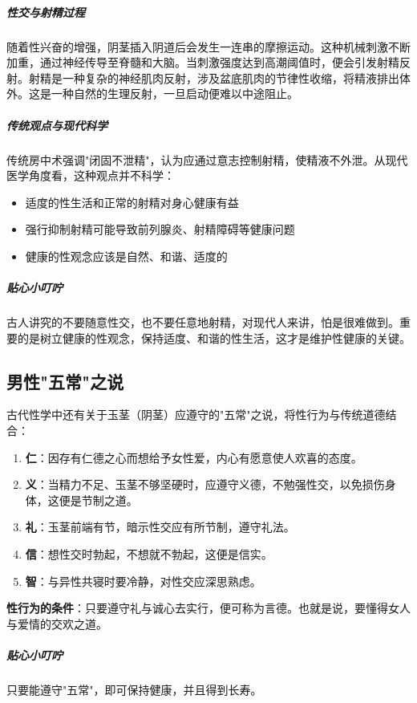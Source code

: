 \begin{enumerate}
\subparagraph{性交与射精过程}

随着性兴奋的增强，阴茎插入阴道后会发生一连串的摩擦运动。这种机械刺激不断加重，通过神经传导至脊髓和大脑。当刺激强度达到高潮阈值时，便会引发射精反射。射精是一种复杂的神经肌肉反射，涉及盆底肌肉的节律性收缩，将精液排出体外。这是一种自然的生理反射，一旦启动便难以中途阻止。

\subparagraph{传统观点与现代科学}

传统房中术强调"闭固不泄精"，认为应通过意志控制射精，使精液不外泄。从现代医学角度看，这种观点并不科学：
\begin{itemize}
    \item 适度的性生活和正常的射精对身心健康有益
    \item 强行抑制射精可能导致前列腺炎、射精障碍等健康问题
    \item 健康的性观念应该是自然、和谐、适度的
\end{itemize}

\subparagraph{贴心小叮咛}

古人讲究的不要随意性交，也不要任意地射精，对现代人来讲，怕是很难做到。重要的是树立健康的性观念，保持适度、和谐的性生活，这才是维护性健康的关键。

\subsection{男性"五常"之说}

古代性学中还有关于玉茎（阴茎）应遵守的"五常"之说，将性行为与传统道德结合：

\begin{enumerate}
    \item \textbf{仁}：因存有仁德之心而想给予女性爱，内心有愿意使人欢喜的态度。
    \item \textbf{义}：当精力不足、玉茎不够坚硬时，应遵守义德，不勉强性交，以免损伤身体，这便是节制之道。
    \item \textbf{礼}：玉茎前端有节，暗示性交应有所节制，遵守礼法。
    \item \textbf{信}：想性交时勃起，不想就不勃起，这便是信实。
    \item \textbf{智}：与异性共寝时要冷静，对性交应深思熟虑。
\end{enumerate}

\textbf{性行为的条件}：只要遵守礼与诚心去实行，便可称为言德。也就是说，要懂得女人与爱情的交欢之道。

\subparagraph{贴心小叮咛}

只要能遵守"五常"，即可保持健康，并且得到长寿。


\end{enumerate}
